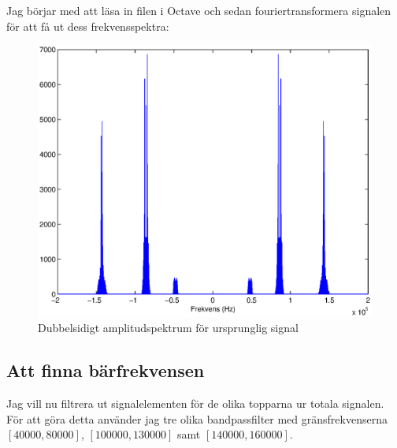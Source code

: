 \documentclass[10pt]{article}
\begin{document}
Jag börjar med att läsa in filen i Octave och sedan fouriertransformera signalen för att få ut dess frekvensspektra: 

\begin{figure}[htp]
  \begin{center}
  \includegraphics[keepaspectratio=true,width=\linewidth]{fft_orig_data.eps}  %
  \end{center}
  \caption{Dubbelsidigt amplitudspektrum för ursprunglig signal} %
  \label{fig:fft_orig_data}
\end{figure}
\newpage

\subsection{Att finna bärfrekvensen}

Jag vill nu filtrera ut signalelementen för de olika topparna ur totala signalen. För att göra detta använder jag tre olika bandpassfilter med gränsfrekvenserna $[40000, 80000]$, $[100000, 130000]$ samt $[140000, 160000]$.
\end{document}
